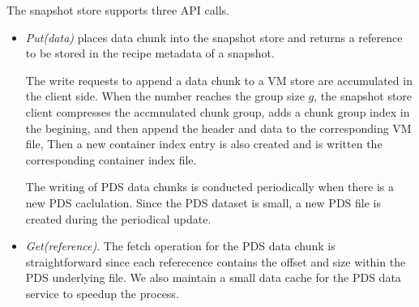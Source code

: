 The snapshot  store supports three API calls.
\begin{itemize}

\item {\em Put(data)} places data chunk into the snapshot store and returns a reference to be stored in 
the recipe metadata of a snapshot. 

The write requests to append a data chunk to a VM store are accumulated in the client side. 
When the number reaches the group size $g$, the snapshot store client compresses
the accmnulated   chunk group, adds a chunk group index  in the begining, and then
append the header and data  to the corresponding VM file,
Then a new container  index entry is also created and is written the corresponding
container index file.

The writing of PDS data chunks is conducted periodically when there is a new PDS caclulation.
Since the PDS dataset is small, a new PDS file is created during the periodical update.
\item{\em Get(reference)}.
The fetch operation for the PDS data chunk is straightforward since each referecence contains 
the offset and size within the PDS  underlying  file.
We also maintain a small data cache for the PDS data service to speedup the process.


\end{itemize}
